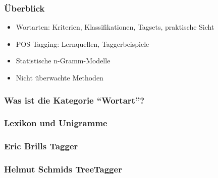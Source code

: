 \begin{frame}
  \frametitle{Überblick}
  \begin{itemize}
  \item Wortarten: Kriterien, Klassifikationen, Tagsets, praktische Sicht
  \item POS-Tagging: Lernquellen, Taggerbeispiele
  \item Statistische n-Gramm-Modelle
  \item Nicht überwachte Methoden
  \end{itemize}
\end{frame}

\begin{frame}
  \frametitle{Was ist die Kategorie "`Wortart"'?}  
\end{frame}

\begin{frame}
  \frametitle{Lexikon und Unigramme}

\end{frame}

\begin{frame}
  \frametitle{Eric Brills Tagger}

\end{frame}

\begin{frame}
  \frametitle{Helmut Schmids TreeTagger}
\end{frame}

\frame{
  \nocite{*}
  \printbibliography
}


